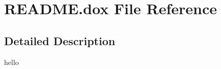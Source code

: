 \hypertarget{README_8dox}{}\section{R\+E\+A\+D\+M\+E.\+dox File Reference}
\label{README_8dox}


\subsection{Detailed Description}
hello 